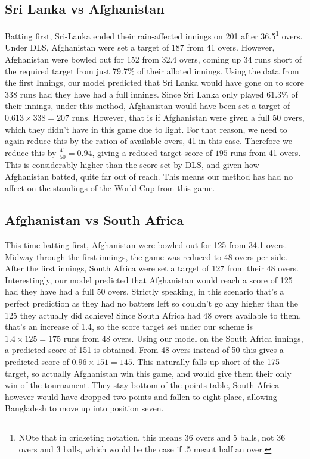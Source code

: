 \subsection{Sri Lanka vs Afghanistan}
Batting first, Sri-Lanka ended their rain-affected innings on 201 after 36.5\footnote{NOte that in cricketing notation, this means 36 overs and 5 balls, not 36 overs and 3 balls, which would be the case if .5 meant half an over.} overs.
Under DLS, Afghanistan were set a target of 187 from 41 overs. However, Afghanistan were bowled out for 152 from 32.4 overs, coming up 34 runs short of the required target from just 79.7\% of their alloted innings. 
Using the data from the first Innings, our model predicted that Sri Lanka would have gone on to score 338 runs had they have had a full innings. Since Sri Lanka only played $61.3\%$ of their innings, under this method, Afghanistan 
would have been set a target of $0.613 \times 338 = 207 \text{ runs}$. However, that is if Afghanistan were given a full 50 overs, which they didn't have in this game due to light. For that reason, we need 
to again reduce this by the ration of available overs, 41 in this case. Therefore we reduce this by $\frac{41}{50}=0.94$, giving a reduced target score of $195$ runs from 41 overs. This is considerably higher than the 
score set by DLS, and given how Afghanistan batted, quite far out of reach. This means our method has had no affect on the standings of the World Cup from this game.

\subsection{Afghanistan vs South Africa}
This time batting first, Afghanistan were bowled out for 125 from 34.1 overs. Midway through the first innings, the game was reduced to 48 overs per side. After the first innings, South Africa were set 
a target of 127 from their 48 overs. Interestingly, our model predicted that Afghanistan would reach a score of 125 had they have had a full 50 overs. Strictly speaking, in this scenario that's a perfect prediction 
as they had no batters left so couldn't go any higher than the 125 they actually did achieve! Since South Africa had 48 overs available to them, that's an increase of 1.4, so the score target set under our scheme
is $1.4 \times 125 = 175$ runs from 48 overs. Using our model on the South Africa innings, a predicted score of 151 is obtained. From 48 overs instead of 50 this gives a predicted score of $0.96 \times 151 = 145$. 
This naturally falls up short of the 175 target, so actually Afghanistan win this game, and would give them their only win of the tournament. They stay bottom of the points table, South Africa however would have 
dropped two points and fallen to eight place, allowing Bangladesh to move up into position seven. 


